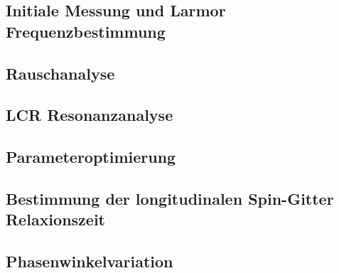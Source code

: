 \documentclass{article}
\begin{document}
    \subsection{Initiale Messung und Larmor Frequenzbestimmung}\label{subsec:2:InitialeMessung}
        

    \subsection{Rauschanalyse}\label{subsec:3:Rauschanalyse}
        

    \subsection{LCR Resonanzanalyse}\label{subsec:4:LCRResonanzanalyse}
        

    \subsection{Parameteroptimierung}\label{subsec:5:Parameteroptimierung}
        

    \subsection{Bestimmung der longitudinalen Spin-Gitter Relaxionszeit}\label{subsec:8:BestimmungDerLongitudinalenSpinGitterRelaxionszeit}
        

    \subsection{Phasenwinkelvariation}
        
\end{document}
